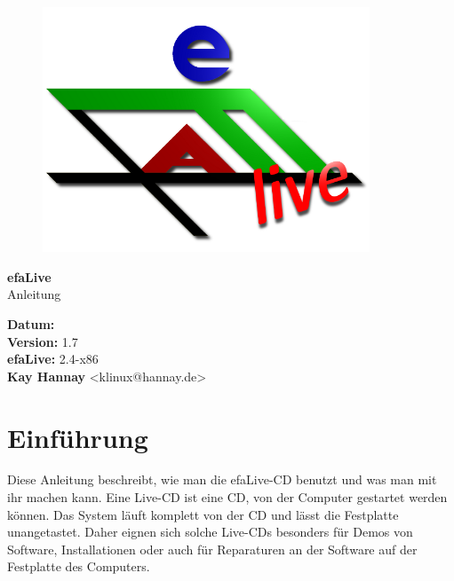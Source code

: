 \documentclass[a4paper,12pt,twoside]{article}
\title{\Title}
\author{\Author}
\date{\DocDate}
\begin{document}

\begin{titlepage}
    \vspace*{1cm}
    \begin{center}
        \begin{figure}
            \centering
            \includegraphics[width=9.745cm,height=7.308cm]{screenshots/efaLivede-img1.png}
        \end{figure}
        \Huge
        \textbf{efaLive} \\[0.1cm]
        \LARGE
        Anleitung \\[5cm]
    \end{center}
    \normalsize
    \vspace*{4cm}
    \textbf{Datum:} {\DocDate} \\
    \textbf{Version:} 1.7 \\
    \textbf{efaLive:} 2.4-x86 \\
    \textbf{Kay Hannay} <klinux@hannay.de> \\
\end{titlepage}


\tableofcontents
\clearpage\setcounter{page}{1}
\section{Einführung}
\label{sct:einfuehrung}
Diese Anleitung beschreibt, wie man die efaLive-CD benutzt und was man
mit ihr machen kann. Eine Live-CD ist eine CD, von der Computer
gestartet werden können. Das System läuft komplett von der CD und lässt
die Festplatte unangetastet. Daher eignen sich solche Live-CDs
besonders für Demos von Software, Installationen oder auch für
Reparaturen an der Software auf der Festplatte des Computers.
\end{document}
